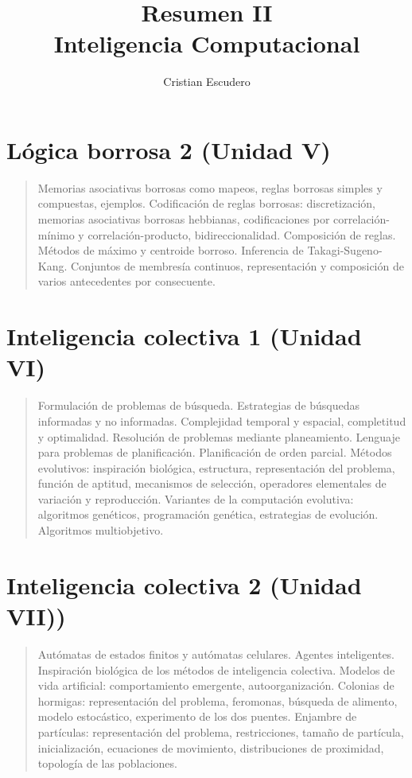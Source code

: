 \documentclass[10pt,a4paper]{article}
\author{Cristian Escudero}
\title{Resumen II\\Inteligencia Computacional}
\begin{document}
\section*{Lógica borrosa 2 (Unidad V)}
\begin{quote}
Memorias asociativas borrosas como mapeos, reglas borrosas simples y compuestas, ejemplos. Codificación de reglas borrosas: discretización, memorias asociativas borrosas hebbianas, codificaciones por correlación-mínimo y correlación-producto, bidireccionalidad. Composición de reglas. Métodos de máximo y centroide borroso. Inferencia de Takagi-Sugeno-Kang. Conjuntos de membresía continuos, representación y composición de varios antecedentes por consecuente.
\end{quote}

\section*{Inteligencia colectiva 1 (Unidad VI)}
\begin{quote}
Formulación de problemas de búsqueda. Estrategias de búsquedas informadas y no informadas. Complejidad temporal y espacial, completitud y optimalidad. Resolución de problemas mediante planeamiento. Lenguaje para problemas de planificación. Planificación de orden parcial. Métodos evolutivos: inspiración biológica, estructura, representación del problema, función de aptitud, mecanismos de selección, operadores elementales de variación y reproducción. Variantes de la computación evolutiva: algoritmos genéticos, programación genética, estrategias de evolución. Algoritmos multiobjetivo.
\end{quote}

\section*{Inteligencia colectiva 2 (Unidad VII))}
\begin{quote}
Autómatas de estados finitos y autómatas celulares. Agentes inteligentes. Inspiración biológica de los métodos de inteligencia colectiva. Modelos de vida artificial: comportamiento emergente, autoorganización. Colonias de hormigas: representación del problema, feromonas, búsqueda de alimento, modelo estocástico, experimento de los dos puentes. Enjambre de partículas: representación del problema, restricciones, tamaño de partícula, inicialización, ecuaciones de movimiento, distribuciones de proximidad, topología de las poblaciones.
\end{quote}
\end{document}
